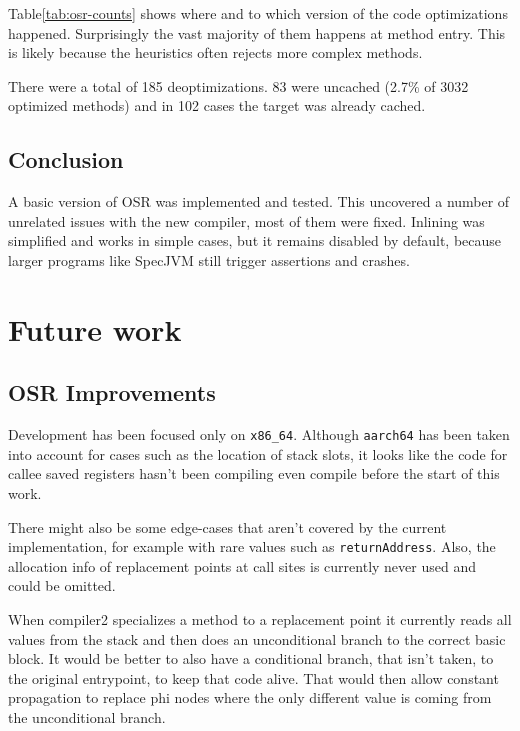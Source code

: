 \documentclass[draft,final]{vutinfth} %
\begin{document}
    Table\ref{tab:osr-counts} shows where and to which version of the code optimizations happened.
    Surprisingly the vast majority of them happens at method entry.
    This is likely because the heuristics often rejects more complex methods.

    There were a total of 185 deoptimizations.
    83 were uncached (2.7\% of 3032 optimized methods)
    and in 102 cases the target was already cached.


    \section{Conclusion}

    A basic version of OSR was implemented and tested.
    This uncovered a number of unrelated issues with the new compiler, most of them were fixed.
    Inlining was simplified and works in simple cases,
    but it remains disabled by default,
    because larger programs like SpecJVM still trigger assertions and crashes.


    \chapter{Future work}


    \section{OSR Improvements}

    Development has been focused only on \texttt{x86\_64}.
    Although \texttt{aarch64} has been taken into account for cases
    such as the location of stack slots,
    it looks like the code for callee saved registers
    hasn't been compiling even compile before the start of this work.

    There might also be some edge-cases that aren't covered by the current implementation,
    for example with rare values such as \lstinline{returnAddress}.
    Also, the allocation info of replacement points at call sites is currently never used
    and could be omitted.

    When compiler2 specializes a method to a replacement point
    it currently reads all values from the stack
    and then does an unconditional branch to the correct basic block.
    It would be better to also have a conditional branch,
    that isn't taken,
    to the original entrypoint,
    to keep that code alive.
    That would then allow constant propagation to replace phi nodes where
    the only different value is coming from the unconditional branch.
\end{document}
